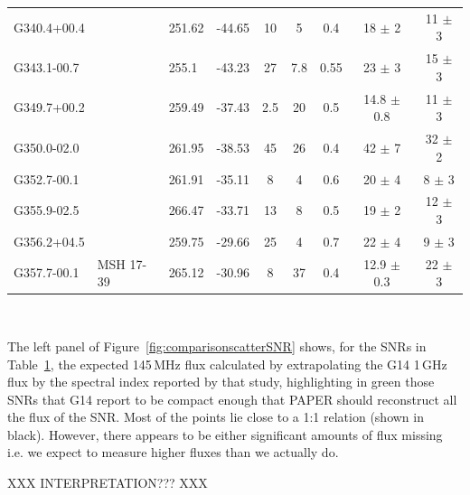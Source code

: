 \documentclass[useAMS,usenatbib]{mn2e}
\begin{document}
\begin{table}
\begin{tabular}{llllccccc}
G340.4+00.4	&		&	251.62	&	-44.65	&	10	&	5	&	0.4	&	18	$\pm$	2	&	11	$\pm$	3	\\
G343.1-00.7	&		&	255.1	&	-43.23	&	27	&	7.8	&	0.55	&	23	$\pm$	3	&	15	$\pm$	3	\\
G349.7+00.2	&		&	259.49	&	-37.43	&	2.5	&	20	&	0.5	&	14.8	$\pm$	0.8	&	11	$\pm$	3	\\
G350.0-02.0	&		&	261.95	&	-38.53	&	45	&	26	&	0.4	&	42	$\pm$	7	&	32	$\pm$	2	\\
G352.7-00.1	&		&	261.91	&	-35.11	&	8	&	4	&	0.6	&	20	$\pm$	4	&	8	$\pm$	3	\\
G355.9-02.5	&		&	266.47	&	-33.71	&	13	&	8	&	0.5	&	19	$\pm$	2	&	12	$\pm$	3	\\
G356.2+04.5	&		&	259.75	&	-29.66	&	25	&	4	&	0.7	&	22	$\pm$	4	&	9	$\pm$	3	\\
G357.7-00.1	&	MSH 17-39	&	265.12	&	-30.96	&	8	&	37	&	0.4	&	12.9	$\pm$	0.3	&	22	$\pm$	3	\\
\hline
\end{tabular}
\\
\label{tab:G14comparison}
\end{table}

The left panel of Figure~\ref{fig:comparisonscatterSNR} shows, for the SNRs in Table~\ref{tab:G14comparison}, the expected 145\,MHz flux calculated by extrapolating the G14 1\,GHz flux by the spectral index reported by that study, highlighting in green those SNRs that G14 report to be compact enough that PAPER should reconstruct all the flux of the SNR. Most of the points lie close to a 1:1 relation (shown in black). However, there appears to be either significant amounts of flux missing i.e. we expect to measure higher fluxes than we actually do. 

XXX INTERPRETATION??? XXX
\end{document}
